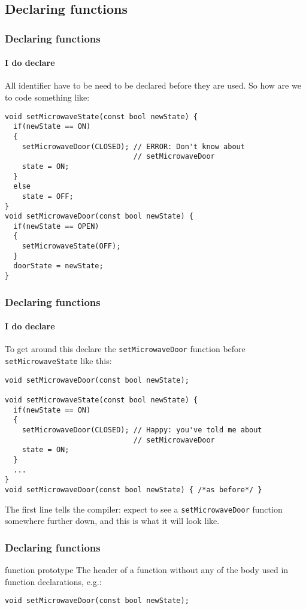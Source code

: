 \documentclass{beamer}
\begin{document}
\subsection{Declaring functions}

\begin{frame}[fragile]
  \frametitle{Declaring functions}
  \framesubtitle{I do declare}
  
  All identifier have to be need to be declared before they are used.  So how are we to code something like:
  \begin{lstlisting}
void setMicrowaveState(const bool newState) {
  if(newState == ON)
  {
    setMicrowaveDoor(CLOSED); // ERROR: Don't know about 
                              // setMicrowaveDoor
    state = ON;
  }
  else
  	state = OFF;
}
void setMicrowaveDoor(const bool newState) {
  if(newState == OPEN)
  {
    setMicrowaveState(OFF);
  }
  doorState = newState;
}
  \end{lstlisting}
\end{frame}


\begin{frame}[fragile]
  \frametitle{Declaring functions}
  \framesubtitle{I do declare}
  
  To get around this declare the \texttt{setMicrowaveDoor} function before \texttt{setMicrowaveState} like this:
  \begin{lstlisting}
void setMicrowaveDoor(const bool newState);

void setMicrowaveState(const bool newState) {
  if(newState == ON)
  {
    setMicrowaveDoor(CLOSED); // Happy: you've told me about
                              // setMicrowaveDoor
    state = ON;
  }
  ...
}
void setMicrowaveDoor(const bool newState) { /*as before*/ }
  \end{lstlisting}
  The first line tells the compiler: expect to see a \texttt{setMicrowaveDoor} function somewhere further down, and this is what it will look like.
\end{frame}

\begin{frame}[fragile]
  \frametitle{Declaring functions}
  \begin{defiblocke}{function prototype}%
The header of a function without any of the body used in function declarations, e.g.:
    \begin{lstlisting}
void setMicrowaveDoor(const bool newState);
    \end{lstlisting}
  \end{defiblocke}
\end{frame}
\end{document}
